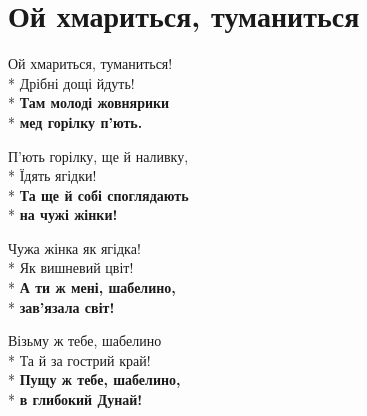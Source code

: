 \vspace{\fill}\newpage

\section{Ой хмариться, туманиться}
\label{song:Ой_хмариться,_туманиться}

\medskip

\begin{minipage}{\linewidth}
Ой хмариться, туманиться!\\*
Дрібні дощі йдуть!\\*
\textbf{Там молоді жовнярики}\\*
\textbf{мед горілку п’ють.}\\
\end{minipage}\par\medskip\nobreak

\medskip

\begin{minipage}{\linewidth}
П’ють горілку, ще й наливку,\\*
Їдять ягідки!\\*
\textbf{Та ще й собі споглядають}\\*
\textbf{на чужі жінки!}\\
\end{minipage}\par\medskip\nobreak

\medskip

\begin{minipage}{\linewidth}
Чужа жінка як ягідка!\\*
Як вишневий цвіт!\\*
\textbf{А ти ж мені, шабелино,}\\*
\textbf{зав’язала світ!}\\
\end{minipage}\par\medskip\nobreak

\medskip

\begin{minipage}{\linewidth}
Візьму ж тебе, шабелино\\*
Та й за гострий край!\\*
\textbf{Пущу ж тебе, шабелино,}\\*
\textbf{в глибокий Дунай!}\\
\end{minipage}\par\medskip\nobreak

\medskip

